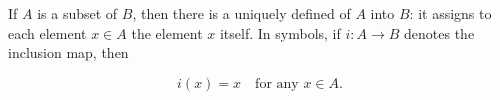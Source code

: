 If $A$ is a subset of $B$, then there is a uniquely defined  of $A$ into $B$: it assigns to each element $x \in A$ the element $x$ itself. In symbols, if $i : A \to B$ denotes the inclusion map, then

$$i(x) = x \quad \text{for any } x \in A.$$
